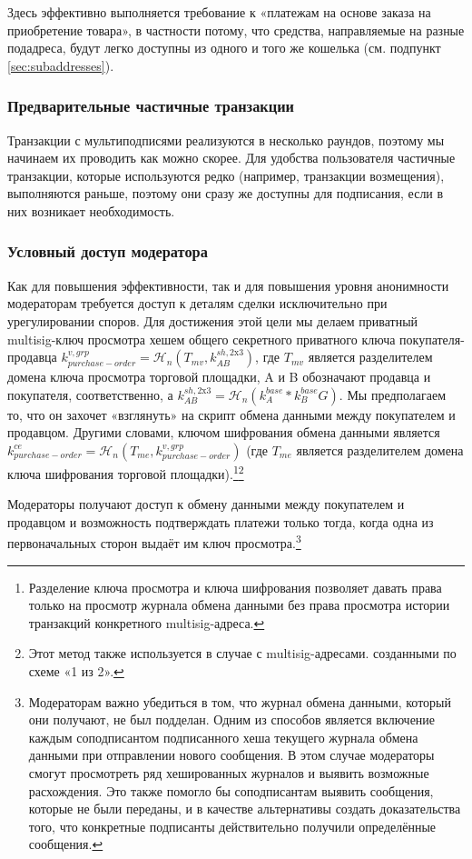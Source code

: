 Здесь эффективно выполняется требование к «платежам на основе заказа на приобретение товара», в частности потому, что средства, направляемые на разные подадреса, будут легко доступны из одного и того же кошелька (см. подпункт \ref{sec:subaddresses}).

\subsubsection*{Предварительные частичные транзакции}

Транзакции с мультиподписями реализуются в несколько раундов, поэтому мы начинаем их проводить как можно скорее. Для удобства пользователя частичные транзакции, которые используются редко (например, транзакции возмещения), выполняются раньше, поэтому они сразу же доступны для подписания, если в них возникает необходимость.

\subsubsection*{Условный доступ модератора}

Как для повышения эффективности, так и для повышения уровня анонимности модераторам требуется доступ к деталям сделки исключительно при урегулировании споров. Для дости\-жения этой цели мы делаем приватный multisig-ключ просмотра хешем общего секретного приватного ключа покупателя-продавца $k^{v,grp}_{purchase-order} = \mathcal{H}_n(T_{mv},k^{sh,\textrm{2x3}}_{AB})$, где $T_{mv}$ является разделителем домена ключа просмотра торговой площадки, A и B обозначают продавца и покупателя, соответственно, а $k^{sh,\textrm{2x3}}_{AB} = \mathcal{H}_n(k^{base}_{A}*k^{base}_{B} G)$. Мы предполагаем то, что он захочет «взглянуть» на скрипт обмена данными между покупателем и продавцом. Другими словами, ключом шифрования обмена данными является $k^{ce}_{purchase-order} = \mathcal{H}_n(T_{me},k^{v,grp}_{purchase-order})$ (где $T_{me}$ является разделителем домена ключа шифрования торговой площадки).\footnote{Разделение ключа просмотра и ключа шифрования позволяет давать права только на просмотр журнала обмена данными без права просмотра истории транзакций конкретного multisig-адреса.}\footnote{Этот метод также используется в случае с multisig-адресами. созданными по схеме «1 из 2».}

Модераторы получают доступ к обмену данными между покупателем и продавцом и возмож\-ность подтверждать платежи только тогда, когда одна из первоначальных сторон выдаёт им ключ просмотра.\footnote{Модераторам важно убедиться в том, что журнал обмена данными, который они получают, не был подделан. Одним из способов является включение каждым соподписантом подписанного хеша текущего журнала обмена данными при отправлении нового сообщения. В этом случае модераторы смогут просмотреть ряд хешированных журналов и выявить возможные расхождения. Это также помогло бы соподписантам выявить сообщения, которые не были переданы, и в качестве альтернативы создать доказательства того, что конкретные подписанты действительно получили определённые сообщения.}


